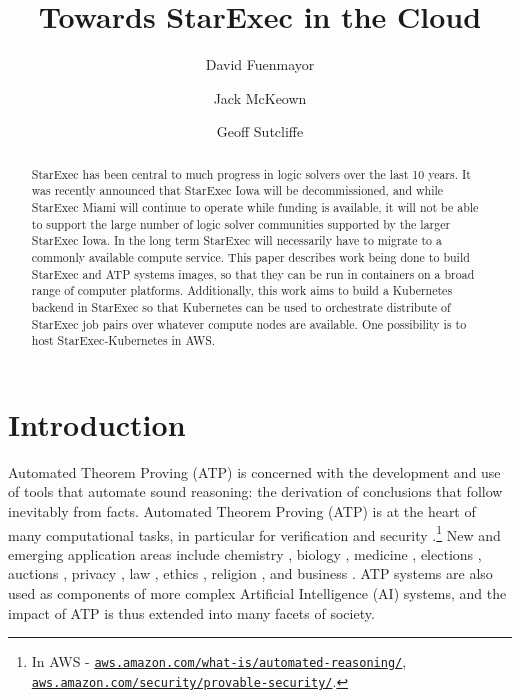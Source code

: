 \documentclass{easychair}
\title{Towards StarExec in the Cloud}
\author{
  David Fuenmayor\inst{1}
\and
  Jack McKeown\inst{2}
\and
  Geoff Sutcliffe\inst{2}
}
\institute{
  University of Bamberg,
  Bamberg, Germany\\
  \email{david.fuenmayor@uni-bamberg.de}
\and
  University of Miami,
  Miami, USA\\
  \email{jam771@miami.edu,geoff@cs.miami.edu}
}
\begin{document}
\maketitle

\begin{abstract}
StarExec has been central to much progress in logic solvers over the last 10 years.
It was recently announced that StarExec Iowa will be decommissioned, and while StarExec Miami 
will continue to operate while funding is available, it will not be able to support the large 
number of logic solver communities supported by the larger StarExec Iowa. 
In the long term StarExec will necessarily have to migrate to a commonly available compute 
service. 
This paper describes work being done to build StarExec and ATP systems images, so that they can 
be run in containers on a broad range of computer platforms. 
Additionally, this work aims to build a Kubernetes backend in StarExec so that Kubernetes can 
be used to orchestrate distribute of StarExec job pairs over whatever compute nodes are available.
One possibility is to host StarExec-Kubernetes in AWS.
\end{abstract}
\section{Introduction}
\label{Introduction}

Automated Theorem Proving (ATP) is concerned with the development and use of tools that automate 
sound reasoning: the derivation of conclusions that follow inevitably from facts.
Automated Theorem Proving (ATP) is at the heart of many computational tasks, in particular for
verification \cite{Har06,HH19} and security \cite{Coo18}.\footnote{%
In AWS -
\href{https://aws.amazon.com/what-is/automated-reasoning/}{\tt aws.amazon.com/what-is/automated-reasoning/}, 
\href{https://aws.amazon.com/security/provable-security//}{\tt aws.amazon.com/security/provable-security/}.} 
New and emerging application areas include
chemistry \cite{Yad17}, 
biology \cite{CC+13}, 
medicine \cite{HLB05},
elections \cite{Nip09,BDS17}, 
auctions \cite{CK+15}, 
privacy \cite{Lib20},
law \cite{PS15}, 
ethics \cite{DF+16}, 
religion \cite{OZ11,BW14-ECAI,Hor19},
and business \cite{Han98}.
ATP systems are also used as components of more complex Artificial Intelligence (AI) systems,
and the impact of ATP is thus extended into many facets of society.
\end{document}
